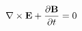 \begin{equation} \label{faraday}
\nabla\times{\bf E} + \frac{\partial{\bf B}}{\partial t} = 0
\end{equation}

